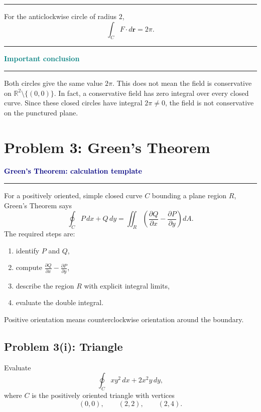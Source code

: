 \documentclass[11pt,a4paper]{article}
\newenvironment{methodbox}[1]{%
  \par\medskip
  \noindent\textcolor{navy}{\bfseries #1}\par
  \noindent\textcolor{navy}{\rule{\linewidth}{0.55pt}}\par\smallskip
}{\par\medskip}
\newenvironment{reasonbox}[1]{%
  \par\medskip
  \noindent\textcolor{teal}{\bfseries #1}\par
  \noindent\textcolor{teal}{\rule{0.72\linewidth}{0.45pt}}\par\smallskip
}{\par\medskip}
\newenvironment{answerbox}{%
  \par\medskip
  \noindent\textcolor{orange}{\rule{\linewidth}{0.8pt}}\par
  \begingroup\bfseries
}{%
  \par\endgroup
  \noindent\textcolor{orange}{\rule{\linewidth}{0.8pt}}\par\medskip
}
\newcommand{\R}{\mathbb{R}}
\newcommand{\pd}[2]{\frac{\partial #1}{\partial #2}}
\begin{document}
\begin{answerbox}
For the anticlockwise circle of radius \(2\),
\[
\boxed{\int_C F\cdot d\mathbf r=2\pi}.
\]
\end{answerbox}

\begin{reasonbox}{Important conclusion}
Both circles give the same value \(2\pi\).  This does not mean the field is conservative on \(\R^2\setminus\{(0,0)\}\).  In fact, a conservative field has zero integral over every closed curve.  Since these closed circles have integral \(2\pi\neq0\), the field is not conservative on the punctured plane.
\end{reasonbox}

\newpage
\section{Problem 3: Green's Theorem}

\begin{methodbox}{Green's Theorem: calculation template}
For a positively oriented, simple closed curve \(C\) bounding a plane region \(R\), Green's Theorem says
\[
\oint_C P\,dx+Q\,dy
=\iint_R\left(\pd{Q}{x}-\pd{P}{y}\right)dA.
\]
The required steps are:
\begin{enumerate}
    \item identify \(P\) and \(Q\),
    \item compute \(\pd{Q}{x}-\pd{P}{y}\),
    \item describe the region \(R\) with explicit integral limits,
    \item evaluate the double integral.
\end{enumerate}
Positive orientation means counterclockwise orientation around the boundary.
\end{methodbox}

\subsection{Problem 3(i): Triangle}
Evaluate
\[
\oint_C xy^2\,dx+2x^2y\,dy,
\]
where \(C\) is the positively oriented triangle with vertices
\[
(0,0),\qquad (2,2),\qquad (2,4).
\]
\end{document}
